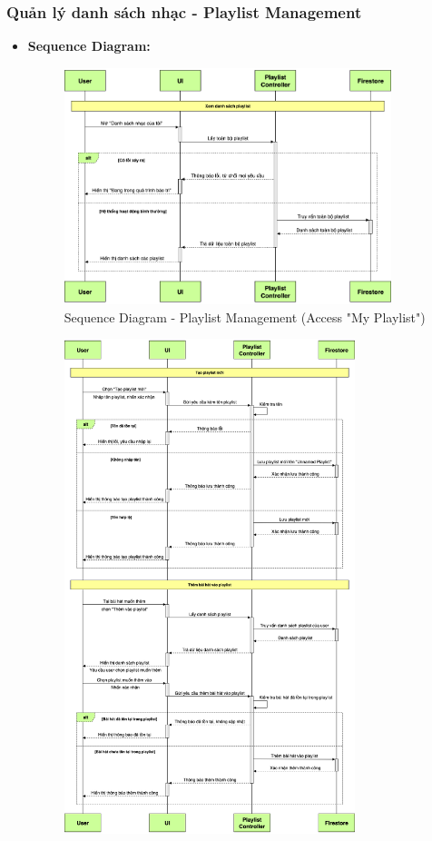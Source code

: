 \documentclass[a4paper]{article}
\begin{document}
\subsubsection{Quản lý danh sách nhạc - Playlist Management}
\begin{itemize}
	\item \textbf{Sequence Diagram:}
	      \begin{figure}[H]
		      \centering
		      \includegraphics[width=0.9\textwidth]{Images/playlist/playlist-1_sd.png}
		      \caption{Sequence Diagram - Playlist Management (Access "My Playlist")}
	      \end{figure}
        \begin{figure}[H]
		      \centering
		      \includegraphics[width=0.8\textwidth]{Images/playlist/playlist-3ab_sd.png}

\end{figure}
\end{itemize}
\end{document}

